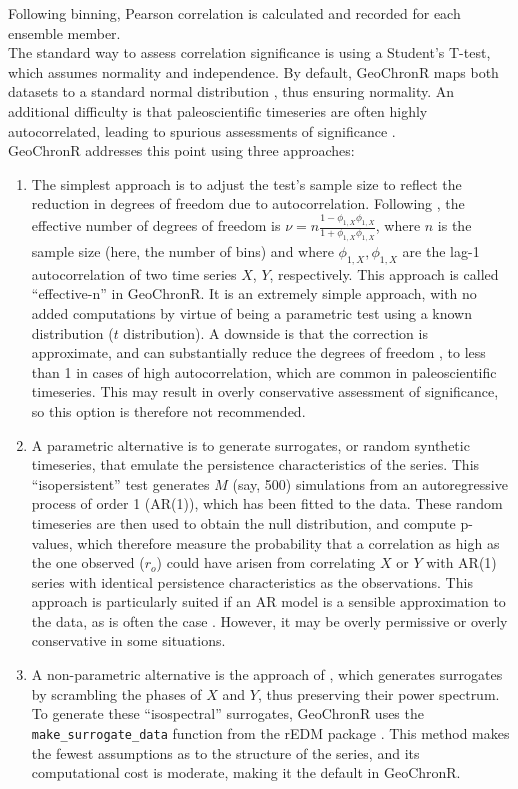 \documentclass[gchron, manuscript]{copernicus}
\begin{document}
Following binning, Pearson correlation is calculated and recorded for each ensemble member.\\
The standard way to assess correlation significance is using a Student's T-test, which assumes normality and independence.
By default, GeoChronR maps both datasets to a standard normal distribution \citep[\citet{JEG_Tingley_CP2016}]{vanAlbada2007}, thus ensuring normality.
An additional difficulty is that paleoscientific timeseries are often highly autocorrelated, leading to spurious assessments of significance \citep{Hu_epsl17}.\\
GeoChronR addresses this point using three approaches:

\begin{enumerate}
\def\labelenumi{\arabic{enumi}.}
\item
  The simplest approach is to adjust the test's sample size to reflect the reduction in degrees of freedom due to autocorrelation. Following \citet{dawdy1964statistical}, the effective number of degrees of freedom is \(\nu = n \frac{1-\phi_{1,X}\phi_{1,X}}{1+\phi_{1,X}\phi_{1,X}}\), where \(n\) is the sample size (here, the number of bins) and where \(\phi_{1,X}, \phi_{1,X}\) are the lag-1 autocorrelation of two
  time series \(X\), \(Y\), respectively. This approach is called ``effective-n'' in GeoChronR. It is an extremely simple approach, with no added computations by virtue of being a parametric test using a known distribution (\(t\) distribution).
  A downside is that the correction is approximate, and can substantially reduce the degrees of freedom \citep{Hu_epsl17}, to less than 1 in cases of high autocorrelation, which are common in paleoscientific timeseries.
  This may result in overly conservative assessment of significance, so this option is therefore not recommended.
\item
  A parametric alternative is to generate surrogates, or random synthetic timeseries, that emulate the persistence characteristics of the series.
  This ``isopersistent'' test generates \(M\) (say, 500) simulations from an autoregressive process of order 1 (AR(1)), which has been fitted to the data.
  These random timeseries are then used to obtain the null distribution, and compute p-values, which therefore measure the probability that a correlation as high as the one observed (\(r_o\)) could have arisen from correlating \(X\) or \(Y\) with AR(1) series with identical persistence characteristics as the observations.
  This approach is particularly suited if an AR model is a sensible approximation to the data, as is often the case \citep{Ghil02}.
  However, it may be overly permissive or overly conservative in some situations.
\item
  A non-parametric alternative is the approach of \citet{Ebisuzaki_JClim97}, which generates surrogates by scrambling the phases of \(X\) and \(Y\), thus preserving their power spectrum.
  To generate these ``isospectral'' surrogates, GeoChronR uses the \texttt{make\_surrogate\_data} function from the rEDM package \citep{rEDM}.
  This method makes the fewest assumptions as to the structure of the series, and its computational cost is moderate, making it the default in GeoChronR.
\end{enumerate}
\end{document}
